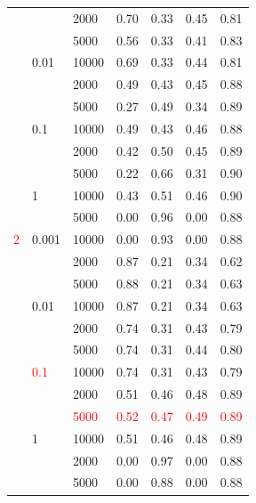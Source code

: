 \documentclass[a4paper,10pt]{article}
\begin{document}
\begin{table}[!ht]
\begin{multicols}{2}
\begin{scriptsize}
\begin{tabular}{|lllrrrr|}
      &       & 2000 &       0.70 &       0.33 &       0.45 &       0.81 \\
      &       & 5000 &       0.56 &       0.33 &       0.41 &       0.83 \\
      & 0.01 & 10000 &       0.69 &       0.33 &       0.44 &       0.81 \\
      &       & 2000 &       0.49 &       0.43 &       0.45 &       0.88 \\
      &       & 5000 &       0.27 &       0.49 &       0.34 &       0.89 \\
      & 0.1 & 10000 &       0.49 &       0.43 &       0.46 &       0.88 \\
      &       & 2000 &       0.42 &       0.50 &       0.45 &       0.89 \\
      &       & 5000 &       0.22 &       0.66 &       0.31 &       0.90 \\
      & 1 & 10000 &       0.43 &       0.51 &       0.46 &       0.90 \\
      &       & 5000 &       0.00 &       0.96 &       0.00 &       0.88 \\
\textcolor{red}{2} & 0.001 & 10000 &       0.00 &       0.93 &       0.00 &       0.88 \\
      &       & 2000 &       0.87 &       0.21 &       0.34 &       0.62 \\
      &       & 5000 &       0.88 &       0.21 &       0.34 &       0.63 \\
      & 0.01 & 10000 &       0.87 &       0.21 &       0.34 &       0.63 \\
      &       & 2000 &       0.74 &       0.31 &       0.43 &       0.79 \\
      &       & 5000 &       0.74 &       0.31 &       0.44 &       0.80 \\
      & \textcolor{red}{0.1} & 10000 &       0.74 &       0.31 &       0.43 &       0.79 \\
      &       & 2000 &       0.51 &       0.46 &       0.48 &       0.89 \\
      &       & \textcolor{red}{5000} &       \textcolor{red}{0.52} &       \textcolor{red}{0.47} &       \textcolor{red}{0.49} &        \textcolor{red}{0.89} \\
      & 1 & 10000 &       0.51 &       0.46 &       0.48 &       0.89 \\
      &       & 2000 &       0.00 &       0.97 &       0.00 &       0.88 \\
      &       & 5000 &       0.00 &       0.88 &       0.00 &       0.88 \\

\end{tabular}
\end{scriptsize}
\end{multicols}
\end{table}
\end{document}
